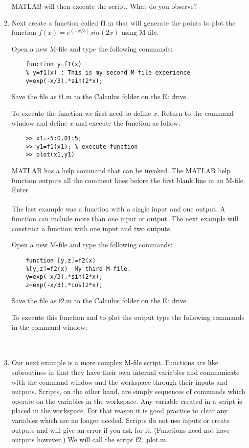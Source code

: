 \begin{enumerate}
  MATLAB will then execute the script.  What do you observe?
  
  \item Next create a function called f1.m that will generate the points to plot
  the function $f(x)=e^{(-x/3)}sin(2x)$ using M-file.
  
  Open a new M-file and type the following commands:
  \begin{verbatim}
    function y=f1(x)
    % y=f1(x) : This is my second M-file experience
    y=exp(-x/3).*sin(2*x);
  \end{verbatim}
  Save the file as f1.m to the Calculus folder on the E: drive.
  
  To execute the function we first need to define $x$.  Return to the command
  window and define $x$  and execute the function as follow:\\
  \begin{verbatim}
    >> x1=-5:0.01:5;
    >> y1=f1(x1); % execute function
    >> plot(x1,y1)
  \end{verbatim}
  
  MATLAB has a help command that can be invoked.  The MATLAB help function outputs
  all the comment lines before the first blank line in an M-file.  Enter\\
  \\
  The last example was a function with a single input and one output.  A function
  can include more than one input or output.  The next example will construct a
  function with one input and two outputs.
  
  Open a new M-file and type the following commands:
  \begin{verbatim}
    function [y,z]=f2(x)
    %[y,z]=f2(x)  My third M-file.
    y=exp(-x/3).*sin(2*x);
    z=exp(-x/3).*cos(2*x);
  \end{verbatim}
  Save the file as f2.m to the Calculus folder on the E: drive.
  
  To execute this function and to plot the output type the following commands in 
  the command window:\\
  \\
  \\
  
  \item Our next example is a more complex M-file script.  Functions are like
  subroutines in that they have their own internal variables and communicate
  with the command window and the workspace through their inputs and outputs. 
  Scripts, on the other hand, are simply sequences of commands which operate on
  the variables in the workspace.  Any variable created in a script is placed in
  the workspace.  For that reason it is good practice to clear any variables
  which are no longer needed.  Scripts do not use inputs or create outputs and
  will give an error if you ask for it.  (Functions need not have outputs
  however.)  We will call the script f2\_plot.m.
  

\end{enumerate}
